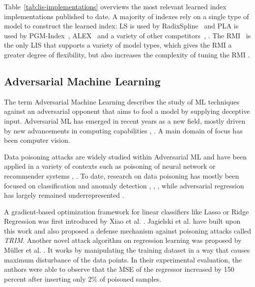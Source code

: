 \documentclass[sigconf]{acmart}
\begin{document}
Table~\ref{tab:lis-implementations} overviews the most relevant learned index implementations published to date. A majority of indexes rely on a single type of model to construct the learned index: \ac{LS} is used by RadixSpline~\cite{RN406} and \ac{PLA} is used by \ac{PGM}-Index~\cite{RN400}, \ac{ALEX}~\cite{RN388} and a variety of other competitors~\cite{RN696}, \cite{RN721}. The \ac{RMI}~\cite{RN385} is the only \ac{LIS} that supports a variety of model types, which gives the \ac{RMI} a greater degree of flexibility, but also increases the complexity of tuning the \ac{RMI} \cite{RN386}.

\subsection{Adversarial Machine Learning}


The term Adversarial Machine Learning describes the study of \acf{ML} techniques against an adversarial opponent that aims to fool a model by supplying deceptive input. Adversarial \ac{ML} has emerged in recent years as a new field, mostly driven by new advancements in computing capabilities \cite{RN701}, \cite{RN727}.  A main domain of focus has been computer vision.

Data poisoning attacks are widely studied within Adversarial \ac{ML} and have been applied in a variety of contexts such as poisoning of neural network or recommender systems \cite{RN447}, \cite{RN705}.  To date, research on data poisoning has mostly been focused on classification and anomaly detection \cite{RN704}, \cite{RN725}, \cite{RN726}, while adversarial regression has largely remained underrepresented \cite{RN459}.

A gradient-based optimization framework for linear classifiers like Lasso or Ridge Regression was first introduced by Xiao et al. \cite{RN706}. Jagielski et al. \cite{RN461} have built upon this work and also proposed a defense mechanism against poisoning attacks called \textit{TRIM}. Another novel attack algorithm on regression learning was proposed by Müller et al. \cite{RN715}. It works by manipulating the training dataset in a way that causes maximum disturbance of the data points. In their experimental evaluation, the authors were able to observe that the \ac{MSE} of the regressor increased by 150 percent after inserting only $2\%$ of poisoned samples.
\end{document}
